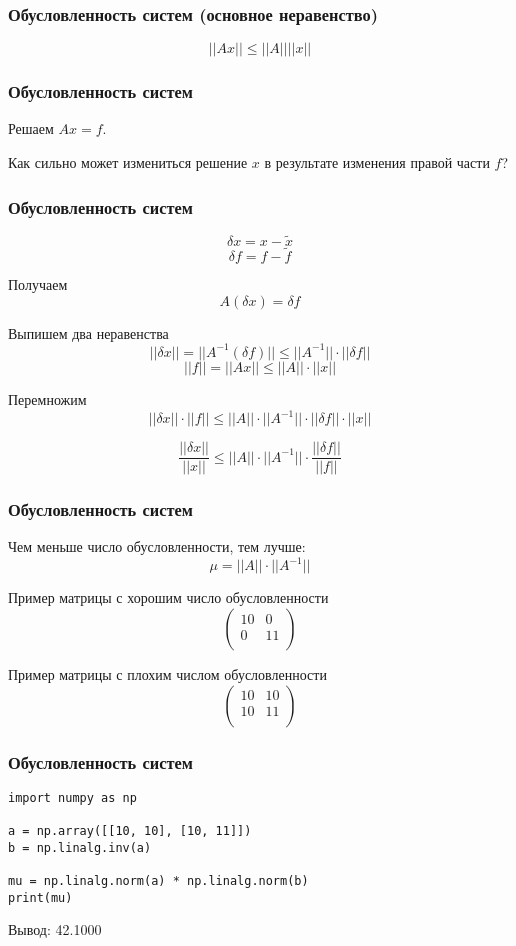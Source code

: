 \documentclass[10pt]{beamer}
\begin{document}
\begin{frame}[fragile]
\frametitle{Обусловленность систем (основное неравенство)}

$$ 
||A x|| \leqslant ||A|| ||x||
$$
\end{frame}


\begin{frame}[fragile]
\frametitle{Обусловленность систем}

Решаем $Ax = f$.

Как сильно может измениться решение $x$ в результате изменения правой части $f$?

\end{frame}


\begin{frame}[fragile]
\frametitle{Обусловленность систем}

$$\delta x = x - \tilde{x}$$
$$\delta f = f - \tilde{f}$$

Получаем
$$A ( \delta x ) = \delta f $$

Выпишем два неравенства
$$|| \delta x || = || A^{-1} ( \delta f )|| \leqslant ||A^{-1}|| \cdot ||\delta f||$$
$$|| f || = || A x|| \leqslant ||A|| \cdot ||x||$$

Перемножим
$$|| \delta x || \cdot || f || \leqslant ||A|| \cdot ||A^{-1}|| \cdot ||\delta f|| \cdot ||x||$$

$$\frac{|| \delta x ||}{||x||} \leqslant ||A|| \cdot ||A^{-1}|| \cdot \frac{||\delta f||}{||f||}$$

\end{frame}

\begin{frame}[fragile]
\frametitle{Обусловленность систем}

Чем меньше число обусловленности, тем лучше:
$$\mu = ||A|| \cdot ||A^{-1}|| $$

Пример матрицы с хорошим число обусловленности
$$
\begin{pmatrix}
10 & 0 \\
0 & 11 \\
\end{pmatrix}
$$

Пример матрицы с плохим числом обусловленности
$$
\begin{pmatrix}
10 & 10 \\
10 & 11 \\
\end{pmatrix}
$$

\end{frame}

\begin{frame}[fragile]
\frametitle{Обусловленность систем}

\begin{lstlisting}
import numpy as np
 
a = np.array([[10, 10], [10, 11]])
b = np.linalg.inv(a)

mu = np.linalg.norm(a) * np.linalg.norm(b)
print(mu)
\end{lstlisting}

Вывод: 42.1000
\end{frame}
\end{document}
